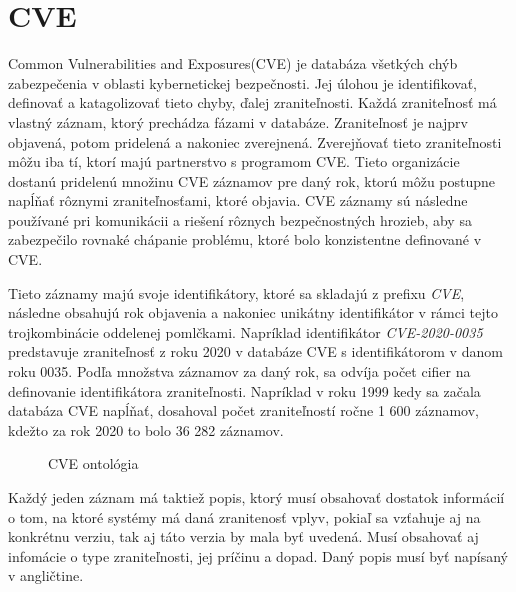 \documentclass[12pt, a4paper, oneside]{book}
\begin{document}
\section{CVE}
Common Vulnerabilities and Exposures(CVE)\citep{cve} je databáza všetkých chýb zabezpečenia v oblasti kybernetickej bezpečnosti. Jej úlohou je identifikovať, definovať a katagolizovať tieto chyby, ďalej zraniteľnosti. Každá zraniteľnosť má vlastný záznam, ktorý prechádza fázami v databáze. Zraniteľnosť je najprv objavená, potom pridelená a nakoniec zverejnená. Zverejňovať tieto zraniteľnosti môžu iba tí, ktorí majú partnerstvo s programom CVE. Tieto organizácie dostanú pridelenú množinu CVE záznamov pre daný rok, ktorú môžu postupne napĺňať rôznymi zraniteľnosťami, ktoré objavia. CVE záznamy sú následne používané pri komunikácii a riešení rôznych bezpečnostných hrozieb, aby sa zabezpečilo rovnaké chápanie problému, ktoré bolo konzistentne definované v CVE.  


Tieto záznamy majú svoje identifikátory, ktoré sa skladajú z prefixu \textit{CVE}, následne obsahujú rok objavenia a nakoniec unikátny identifikátor v rámci tejto trojkombinácie oddelenej pomlčkami. Napríklad identifikátor \textit{CVE-2020-0035} predstavuje  zraniteľnosť z roku 2020 v databáze CVE s identifikátorom v danom roku 0035. Podľa množstva záznamov za daný rok, sa odvíja počet cifier na definovanie identifikátora zraniteľnosti. Napríklad v roku 1999 kedy sa začala databáza CVE napĺňať, dosahoval počet zraniteľností ročne 1 600 záznamov, kdežto za rok 2020 to bolo 36 282 záznamov.


\begin{figure}[!hb]
\label{fig:cveOnto}
\caption{CVE ontológia}
\end{figure}


Každý jeden záznam má taktiež popis, ktorý musí obsahovať dostatok informácií o tom, na ktoré systémy má daná zranitenosť vplyv, pokiaľ sa vzťahuje aj na konkrétnu verziu, tak aj táto verzia by mala byť uvedená. Musí obsahovať aj infomácie o type zraniteľnosti, jej príčinu a dopad. Daný popis musí byť napísaný v angličtine.
\end{document}
